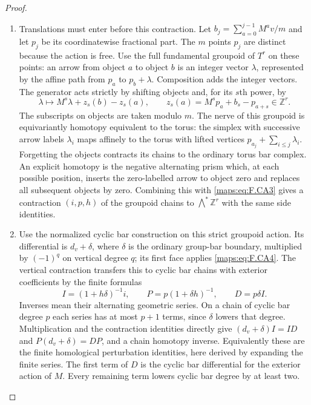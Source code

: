 \documentclass[11pt,a4paper]{article}
\theoremstyle{definition}
\begin{document}
\begin{proof}
\begin{enumerate}[label=\arabic*.]
\item Translations must enter before this contraction.  Let
$b_j=\sum_{a=0}^{j-1}M^av/m$ and let $p_j$ be its coordinatewise
fractional part.  The $m$ points $p_j$ are distinct because the
action is free.  Use the full fundamental groupoid of $T^r$
on these points: an arrow from object $a$ to object $b$ is an
integer vector $\lambda$, represented by the affine path from
$p_a$ to $p_b+\lambda$.  Composition adds the integer vectors.
The generator acts strictly by shifting objects and, for its
$s$th power, by
\[
 \lambda\longmapsto M^s\lambda+z_s(b)-z_s(a),
 \qquad z_s(a)=M^sp_a+b_s-p_{a+s}\in\mathbb Z^r.             \tag{F.CA4}\label{maps:eq:F.CA4}
\]
The subscripts on objects are taken modulo $m$.
The nerve of this groupoid is equivariantly homotopy equivalent
to the torus: the simplex with successive arrow labels
$\lambda_i$ maps affinely to the torus with lifted vertices
$p_{a_j}+\sum_{i\leq j}\lambda_i$.
Forgetting the objects contracts its chains to the ordinary
torus bar complex.  An explicit homotopy is the negative
alternating prism which, at each possible position, inserts
the zero-labelled arrow to object zero and replaces all
subsequent objects by zero.  Combining this with \eqref{maps:eq:F.CA3}
gives a contraction $(i,p,h)$ of the groupoid chains to
$\bigwedge^*\mathbb Z^r$ with the same side identities.

\item Use the normalized cyclic bar construction on this strict
groupoid action.  Its differential is $d_v+\delta$, where
$\delta$ is the ordinary group-bar boundary, multiplied by
$(-1)^q$ on vertical degree $q$; its first face applies \eqref{maps:eq:F.CA4}.
The vertical contraction transfers this to cyclic bar chains
with exterior coefficients by the finite formulas
\[
 I=(1+h\delta)^{-1}i,\qquad
 P=p(1+\delta h)^{-1},\qquad D=p\delta I.                  \tag{F.CA5}\label{maps:eq:F.CA5}
\]
Inverses mean their alternating geometric series.  On a chain
of cyclic bar degree $p$ each series has at most $p+1$ terms,
since $\delta$ lowers that degree.  Multiplication and the
contraction identities directly give $(d_v+\delta)I=ID$ and
$P(d_v+\delta)=DP$,
and a chain homotopy inverse.  Equivalently these are the
finite homological perturbation identities, here derived by
expanding the finite series.  The first term of $D$ is the
cyclic bar differential for the exterior action of $M$.
Every remaining term lowers cyclic bar degree by at least two.


\end{enumerate}
\end{proof}
\end{document}
